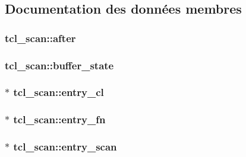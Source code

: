 \subsection{Documentation des données membres}
\hypertarget{structtcl__scan_a4bb2733591b422b55be8fffc83dbb317}{}
\subsubsection[{after}]{ tcl\+\_\+scan\+::after}\label{structtcl__scan_a4bb2733591b422b55be8fffc83dbb317}
\hypertarget{structtcl__scan_aaf056096a727f78a1be5b9a5dcf2a148}{}
\subsubsection[{buffer\+\_\+state}]{ tcl\+\_\+scan\+::buffer\+\_\+state}\label{structtcl__scan_aaf056096a727f78a1be5b9a5dcf2a148}
\hypertarget{structtcl__scan_aeb6315712af342cc7021ee06a6f99908}{}
\subsubsection[{entry\+\_\+cl}]{$\ast$ tcl\+\_\+scan\+::entry\+\_\+cl}\label{structtcl__scan_aeb6315712af342cc7021ee06a6f99908}
\hypertarget{structtcl__scan_a398ca9e031679162c67ce3975639eff9}{}
\subsubsection[{entry\+\_\+fn}]{$\ast$ tcl\+\_\+scan\+::entry\+\_\+fn}\label{structtcl__scan_a398ca9e031679162c67ce3975639eff9}
\hypertarget{structtcl__scan_ad98a63982cc5ec19c916304f7056c52f}{}
\subsubsection[{entry\+\_\+scan}]{$\ast$ tcl\+\_\+scan\+::entry\+\_\+scan}\label{structtcl__scan_ad98a63982cc5ec19c916304f7056c52f}
\hypertarget{structtcl__scan_a858b5f4a6e03f1db3e88b8413218ab04}{}
